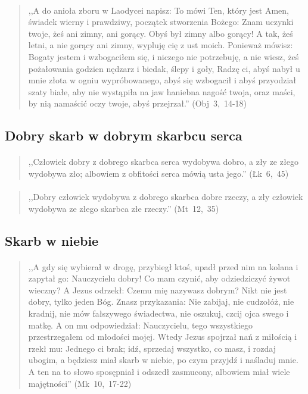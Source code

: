 \documentclass[10pt,a4paper,oneside]{article}
\begin{document}
\paragraph{}
\begin{quote}
,,A do anioła zboru w Laodycei napisz: To mówi Ten, który jest Amen, świadek wierny i prawdziwy, początek stworzenia Bożego: Znam uczynki twoje, żeś ani zimny, ani gorący. Obyś był zimny albo gorący! A tak, żeś letni, a nie gorący ani zimny, wypluję cię z ust moich. Ponieważ mówisz: Bogaty jestem i wzbogaciłem się, i niczego nie potrzebuję, a nie wiesz, żeś pożałowania godzien nędzarz i biedak, ślepy i goły, Radzę ci, abyś nabył u mnie złota w ogniu wypróbowanego, abyś się wzbogacił i abyś przyodział szaty białe, aby nie wystąpiła na jaw haniebna nagość twoja, oraz maści, by nią namaścić oczy twoje, abyś przejrzał.'' \mbox{(Obj 3, 14-18)}
\end{quote}
\subsection{Dobry skarb w dobrym skarbcu serca}
\paragraph{}
\begin{quote}
,,Człowiek dobry z dobrego skarbca serca wydobywa dobro, a zły ze złego wydobywa zło; albowiem z obfitości serca mówią usta jego.'' \mbox{(Łk 6, 45)}
\end{quote}
\paragraph{}
\begin{quote}
,,Dobry człowiek wydobywa z dobrego skarbca dobre rzeczy, a zły człowiek wydobywa ze złego skarbca złe rzeczy.'' \mbox{(Mt 12, 35)}
\end{quote}
\subsection{Skarb w niebie}
\paragraph{}
\begin{quote}
,,A gdy się wybierał w drogę, przybiegł ktoś, upadł przed nim na kolana i zapytał go: Nauczycielu dobry! Co mam czynić, aby odziedziczyć żywot wieczny? A Jezus odrzekł: Czemu mię nazywasz dobrym? Nikt nie jest dobry, tylko jeden Bóg. Znasz przykazania: Nie zabijaj, nie cudzołóż, nie kradnij, nie mów fałszywego świadectwa, nie oszukuj, czcij ojca swego i matkę. A on mu odpowiedział: Nauczycielu, tego wszystkiego przestrzegałem od młodości mojej. Wtedy Jezus spojrzał nań z miłością i rzekł mu: Jednego ci brak; idź, sprzedaj wszystko, co masz, i rozdaj ubogim, a będziesz miał skarb w niebie, po czym przyjdź i naśladuj mnie. A ten na to słowo sposępniał i odszedł zasmucony, albowiem miał wiele majętności'' \mbox{(Mk 10, 17-22)}
\end{quote}
\end{document}
